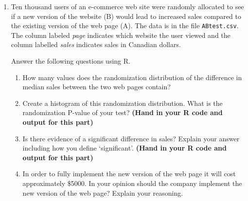\documentclass[11pt, oneside]{article}   	%
\begin{document}
\begin{enumerate}
\begin{enumerate}
\item ({\bf DESIGN II}) Suppose that instead of the design above the scientist uses the following design.

\begin{itemize}
\item weigh both objects in one pan together twice;
\item weigh the objects in opposite pans.
\end{itemize}



{\bf Question:}  Find the least-squares estimates of the weights and standard error of the weights using this design.  

\item Does {\bf DESIGN II} determine the weights of the objects with equal precison compared to {\bf DESIGN I}?  Explain your reasoning.

\end{enumerate}

\newpage

\item Ten thousand users of an e-commerce web site were randomly allocated to see if a new version of the website (B) would lead to increased sales compared to the existing version of the web page (A).   The data is in the file \texttt{ABtest.csv}.  The column labeled {\it page} indicates which website the user viewed and the column labelled {\it sales} indicates sales in Canadian dollars.


Answer the following questions using R. 

\begin{enumerate}
\item  How many values does the randomization distribution of the difference in median sales between the two web pages contain?  
\item  Create a histogram of this randomization distribution.  What is the randomization P-value of your test? {\bf (Hand in your R code and output for this part)}
\item  Is there evidence of a significant difference in sales?  Explain your answer including how you define `significant'. {\bf (Hand in your R code and output for this part)}
\item  In order to fully implement the new version of the web page it will cost approximately \$5000.  In your opinion should the company implement the new version of the web page?  Explain your reasoning.


\end{enumerate}



\end{enumerate}
\end{document}
